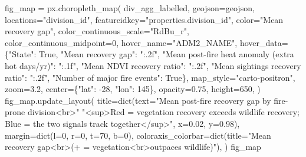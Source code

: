 \documentclass[
  letterpaper,
  DIV=11,
  numbers=noendperiod]{scrartcl}
\newenvironment{Shaded}{\begin{snugshade}}{\end{snugshade}}
\newcommand{\BuiltInTok}[1]{\textcolor[rgb]{0.00,0.23,0.31}{#1}}
\newcommand{\DecValTok}[1]{\textcolor[rgb]{0.68,0.00,0.00}{#1}}
\newcommand{\FloatTok}[1]{\textcolor[rgb]{0.68,0.00,0.00}{#1}}
\newcommand{\NormalTok}[1]{\textcolor[rgb]{0.00,0.23,0.31}{#1}}
\newcommand{\OperatorTok}[1]{\textcolor[rgb]{0.37,0.37,0.37}{#1}}
\newcommand{\StringTok}[1]{\textcolor[rgb]{0.13,0.47,0.30}{#1}}
\newcommand{\VariableTok}[1]{\textcolor[rgb]{0.07,0.07,0.07}{#1}}
\begin{document}
\begin{Shaded}
\begin{Highlighting}[]
\NormalTok{fig\_map }\OperatorTok{=}\NormalTok{ px.choropleth\_map(}
\NormalTok{    div\_agg\_labelled, geojson}\OperatorTok{=}\NormalTok{geojson, locations}\OperatorTok{=}\StringTok{"division\_id"}\NormalTok{, featureidkey}\OperatorTok{=}\StringTok{"properties.division\_id"}\NormalTok{,}
\NormalTok{    color}\OperatorTok{=}\StringTok{"Mean recovery gap"}\NormalTok{, color\_continuous\_scale}\OperatorTok{=}\StringTok{"RdBu\_r"}\NormalTok{, color\_continuous\_midpoint}\OperatorTok{=}\DecValTok{0}\NormalTok{,}
\NormalTok{    hover\_name}\OperatorTok{=}\StringTok{"ADM2\_NAME"}\NormalTok{,}
\NormalTok{    hover\_data}\OperatorTok{=}\NormalTok{\{}\StringTok{"State"}\NormalTok{: }\VariableTok{True}\NormalTok{, }\StringTok{"Mean recovery gap"}\NormalTok{: }\StringTok{":.2f"}\NormalTok{,}
                \StringTok{"Mean post{-}fire heat anomaly (extra hot days/yr)"}\NormalTok{: }\StringTok{":.1f"}\NormalTok{,}
                \StringTok{"Mean NDVI recovery ratio"}\NormalTok{: }\StringTok{":.2f"}\NormalTok{, }\StringTok{"Mean sightings recovery ratio"}\NormalTok{: }\StringTok{":.2f"}\NormalTok{,}
                \StringTok{"Number of major fire events"}\NormalTok{: }\VariableTok{True}\NormalTok{\},}
\NormalTok{    map\_style}\OperatorTok{=}\StringTok{"carto{-}positron"}\NormalTok{, zoom}\OperatorTok{=}\FloatTok{3.2}\NormalTok{, center}\OperatorTok{=}\NormalTok{\{}\StringTok{"lat"}\NormalTok{: }\OperatorTok{{-}}\DecValTok{28}\NormalTok{, }\StringTok{"lon"}\NormalTok{: }\DecValTok{145}\NormalTok{\}, opacity}\OperatorTok{=}\FloatTok{0.75}\NormalTok{, height}\OperatorTok{=}\DecValTok{650}\NormalTok{,}
\NormalTok{)}
\NormalTok{fig\_map.update\_layout(}
\NormalTok{    title}\OperatorTok{=}\BuiltInTok{dict}\NormalTok{(text}\OperatorTok{=}\StringTok{"Mean post{-}fire recovery gap by fire{-}prone division\textless{}br\textgreater{}"}
                     \StringTok{"\textless{}sup\textgreater{}Red = vegetation recovery exceeds wildlife recovery; Blue = the two signals track together\textless{}/sup\textgreater{}"}\NormalTok{,}
\NormalTok{               x}\OperatorTok{=}\FloatTok{0.02}\NormalTok{, y}\OperatorTok{=}\FloatTok{0.98}\NormalTok{),}
\NormalTok{    margin}\OperatorTok{=}\BuiltInTok{dict}\NormalTok{(l}\OperatorTok{=}\DecValTok{0}\NormalTok{, r}\OperatorTok{=}\DecValTok{0}\NormalTok{, t}\OperatorTok{=}\DecValTok{70}\NormalTok{, b}\OperatorTok{=}\DecValTok{0}\NormalTok{),}
\NormalTok{    coloraxis\_colorbar}\OperatorTok{=}\BuiltInTok{dict}\NormalTok{(title}\OperatorTok{=}\StringTok{"Mean recovery gap\textless{}br\textgreater{}(+ = vegetation\textless{}br\textgreater{}outpaces wildlife)"}\NormalTok{),}
\NormalTok{)}
\NormalTok{fig\_map}
\end{Highlighting}
\end{Shaded}
\end{document}
